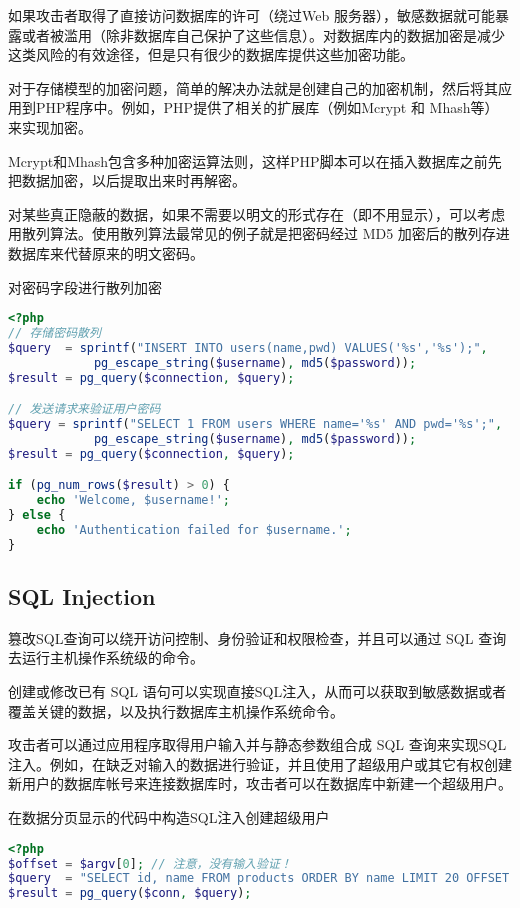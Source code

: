 如果攻击者取得了直接访问数据库的许可（绕过Web 服务器），敏感数据就可能暴露或者被滥用（除非数据库自己保护了这些信息）。对数据库内的数据加密是减少这类风险的有效途径，但是只有很少的数据库提供这些加密功能。

对于存储模型的加密问题，简单的解决办法就是创建自己的加密机制，然后将其应用到PHP程序中。例如，PHP提供了相关的扩展库（例如Mcrypt 和 Mhash等）来实现加密。

Mcrypt和Mhash包含多种加密运算法则，这样PHP脚本可以在插入数据库之前先把数据加密，以后提取出来时再解密。

对某些真正隐蔽的数据，如果不需要以明文的形式存在（即不用显示），可以考虑用散列算法。使用散列算法最常见的例子就是把密码经过 MD5 加密后的散列存进数据库来代替原来的明文密码。


\begin{example}
对密码字段进行散列加密
\begin{lstlisting}[language=PHP]
<?php
// 存储密码散列
$query  = sprintf("INSERT INTO users(name,pwd) VALUES('%s','%s');",
            pg_escape_string($username), md5($password));
$result = pg_query($connection, $query);

// 发送请求来验证用户密码
$query = sprintf("SELECT 1 FROM users WHERE name='%s' AND pwd='%s';",
            pg_escape_string($username), md5($password));
$result = pg_query($connection, $query);

if (pg_num_rows($result) > 0) {
    echo 'Welcome, $username!';
} else {
    echo 'Authentication failed for $username.';
}
\end{lstlisting}
\end{example}


\subsection{SQL Injection}


篡改SQL查询可以绕开访问控制、身份验证和权限检查，并且可以通过 SQL 查询去运行主机操作系统级的命令。


创建或修改已有 SQL 语句可以实现直接SQL注入，从而可以获取到敏感数据或者覆盖关键的数据，以及执行数据库主机操作系统命令。

攻击者可以通过应用程序取得用户输入并与静态参数组合成 SQL 查询来实现SQL注入。例如，在缺乏对输入的数据进行验证，并且使用了超级用户或其它有权创建新用户的数据库帐号来连接数据库时，攻击者可以在数据库中新建一个超级用户。

\begin{example}
在数据分页显示的代码中构造SQL注入创建超级用户
\begin{lstlisting}[language=PHP]
<?php
$offset = $argv[0]; // 注意，没有输入验证！
$query  = "SELECT id, name FROM products ORDER BY name LIMIT 20 OFFSET $offset;";
$result = pg_query($conn, $query);
\end{lstlisting}
\end{example}


